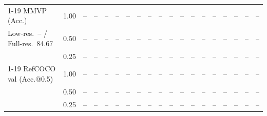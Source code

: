 \begin{table}[t]
{\begin{tabular}{l c | c c c c | c c c c | c c | c c c | c c c c}
\cmidrule(lr){1-19}
MMVP (Acc.) & 1.00 & -- & -- & -- & -- & -- & -- & -- & -- & -- & -- & -- & -- & -- & -- & -- & -- & -- \\
{\footnotesize Low-res.\ -- / Full-res.\ 84.67} & 0.50 & -- & -- & -- & -- & -- & -- & -- & -- & -- & -- & -- & -- & -- & -- & -- & -- & -- \\
 & 0.25 & -- & -- & -- & -- & -- & -- & -- & -- & -- & -- & -- & -- & -- & -- & -- & -- & -- \\
\cmidrule(lr){1-19}
RefCOCO val (Acc.@0.5) & 1.00 & -- & -- & -- & -- & -- & -- & -- & -- & -- & -- & -- & -- & -- & -- & -- & -- & -- \\
 & 0.50 & -- & -- & -- & -- & -- & -- & -- & -- & -- & -- & -- & -- & -- & -- & -- & -- & -- \\
 & 0.25 & -- & -- & -- & -- & -- & -- & -- & -- & -- & -- & -- & -- & -- & -- & -- & -- & -- \\
\bottomrule
\end{tabular}}
\end{table}
